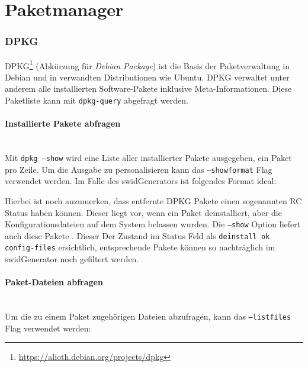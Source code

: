 \section{Paketmanager}

\subsubsection{DPKG}

DPKG\footnote{\url{https://alioth.debian.org/projects/dpkg}} (Abkürzung für
\textit{Debian Package}) ist die Basis der Paketverwaltung in Debian und in
verwandten Distributionen wie Ubuntu. DPKG verwaltet unter anderem alle
installierten Software-Pakete inklusive Meta-Informationen. Diese Paketliste
kann mit \texttt{dpkg-query} abgefragt werden.

\paragraph{Installierte Pakete abfragen} \hspace{0pt} \\

\noindent Mit \texttt{dpkg ---show} wird eine Liste aller installierter Pakete
ausgegeben, ein Paket pro Zeile. Um die Ausgabe zu personalisieren kann das
\texttt{---showformat} Flag verwendet werden. Im Falle des swidGenerators
ist folgendes Format ideal:


\noindent Hierbei ist noch anzumerken, dass entfernte DPKG Pakete einen sogenannten RC Status haben können. Dieser liegt vor, wenn ein Paket deinstalliert, aber die Konfigurationsdateien auf dem System belassen wurden. Die \texttt{---show} Option liefert auch diese Pakete . Dieser Der Zustand im Status Feld als \texttt{deinstall ok config-files} ersichtlich, entsprechende Pakete können so nachträglich im swidGenerator noch gefiltert werden.
\paragraph{Paket-Dateien abfragen} \hspace{0pt} \\

\noindent Um die zu einem Paket zugehörigen Dateien abzufragen, kann das
\texttt{---listfiles} Flag verwendet werden:


